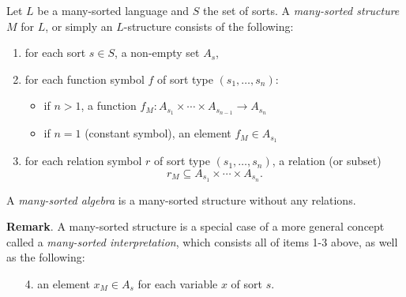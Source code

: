 \documentclass[12pt]{article}
\begin{document}
Let $L$ be a many-sorted language and $S$ the set of sorts.  A \emph{many-sorted structure} $M$ for $L$, or simply an $L$-structure consists of the following:
\begin{enumerate}
\item for each sort $s\in S$, a non-empty set $A_s$,
\item for each function symbol $f$ of sort type $(s_1,\ldots, s_n)$:
\begin{itemize}
\item if $n>1$, a function $f_M: A_{s_1}\times \cdots \times A_{s_{n-1}} \to A_{s_n}$
\item if $n=1$ (constant symbol), an element $f_M\in A_{s_1}$
\end{itemize}
\item for each relation symbol $r$ of sort type $(s_1,\ldots,s_n)$, a relation (or subset) $$r_M\subseteq A_{s_1}\times \cdots \times A_{s_n}.$$
\end{enumerate}

A \emph{many-sorted algebra} is a many-sorted structure without any relations.

\textbf{Remark}.  A many-sorted structure is a special case of a more general concept called a \emph{many-sorted interpretation}, which consists all of items 1-3 above, as well as the following:
\begin{itemize}
\item[4.] an element $x_M\in A_s$ for each variable $x$ of sort $s$.
\end{itemize}
\end{document}
